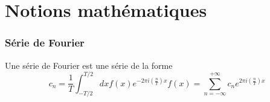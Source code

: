 \documentclass[../notesdecours.tex]{subfiles}
\begin{document}
\part{Notions mathématiques}
\section{Série de Fourier}
Une série de Fourier est une série de la forme
\begin{subequations}
\begin{equation}
c_n = \frac{1}{T} \int^{T/2}_{-T/2} dx f(x)e^{-2\pi i(\frac{n}{T})x}
\end{equation}
\begin{equation}
f(x) = \sum_{n = -\infty}^{+\infty}c_ne^{2\pi i (\frac{n}{T})x}
\end{equation}
\end{subequations}
\end{document}
